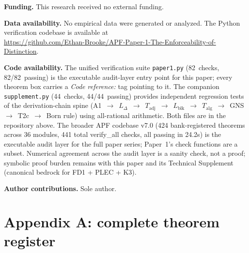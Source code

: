 \documentclass[11pt]{article}
\theoremstyle{remark}
\begin{document}
\noindent\textbf{Funding.}  This research received no external funding.

\noindent\textbf{Data availability.}  No empirical data were generated or analyzed.  The Python verification codebase is available at\\ \url{https://github.com/Ethan-Brooke/APF-Paper-1-The-Enforceability-of-Distinction}.

\noindent\textbf{Code availability.}  The unified verification suite \texttt{paper1.py} (82~checks, 82/82~passing) is the executable audit-layer entry point for this paper; every theorem box carries a \textit{Code reference:} tag pointing to it.  The companion \texttt{supplement.py} (44~checks, 44/44~passing) provides independent regression tests of the derivation-chain spine (A1~$\to$~$L_\Delta$~$\to$~$T_{\mathrm{adj}}$~$\to$~$L_{\mathrm{blk}}$~$\to$~$T_{\mathrm{alg}}$~$\to$~GNS~$\to$~T2c~$\to$~Born rule) using all-rational arithmetic.  Both files are in the repository above.  The broader APF codebase v7.0 (424 bank-registered theorems across 36 modules, 441 total verify\_all checks, all passing in 24.2s) is the executable audit layer for the full paper series; Paper~1's check functions are a subset.  Numerical agreement across the audit layer is a sanity check, not a proof; symbolic proof burden remains with this paper and its Technical Supplement (canonical bedrock for FD1 + PLEC + K3).

\noindent\textbf{Author contributions.}  Sole author.

\section{Appendix A: complete theorem register}
\end{document}
